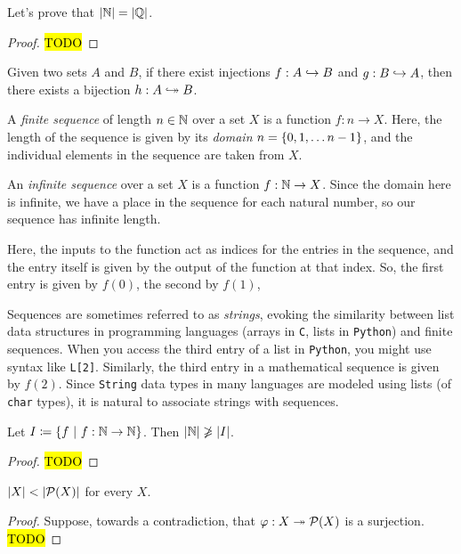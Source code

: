 \begin{example}
    Let's prove that $\cardinality*{\N} = \cardinality*{\Q}$.
\end{example}
\begin{proof}
    \hl{TODO}
\end{proof}

\begin{theorem}
    Given two sets $A$ and $B$,
    if there exist injections $f: A \hookrightarrow B$ and $g: B \hookrightarrow A$,
    then there exists a bijection $h: A \bijection B$.
\end{theorem}

\begin{definition}[Sequences]
    A \emph{finite sequence} of length $n \in \mathbb{N}$ over a set $X$ is a function $f: n \to X$.
    Here, the length of the sequence is given by its \emph{domain} $n = \set*{0, 1, \dots n - 1}$,
    and the individual elements in the sequence are taken from $X$.

    An \emph{infinite sequence} over a set $X$ is a function $f: \mathbb{N} \to X$.
    Since the domain here is infinite, we have a place in the sequence for each natural number,
    so our sequence has infinite length.

    Here, the inputs to the function act as indices for the entries in the sequence,
    and the entry itself is given by the output of the function at that index.
    So, the first entry is given by $f(0)$, the second by $f(1)$, \etc

    Sequences are sometimes referred to as \emph{strings},
    evoking the similarity between list data structures in programming languages
    (\eg arrays in \texttt{C}, lists in \texttt{Python})
    and finite sequences.
    When you access the third entry of a list in \texttt{Python},
    you might use syntax like \texttt{L[2]}.
    Similarly, the third entry in a mathematical sequence is given by $f(2)$.
    Since \texttt{String} data types in many languages are modeled using lists (\eg of \texttt{char} types),
    it is natural to associate strings with sequences.
\end{definition}

\begin{theorem}
    Let $I \defn \set*{f \suchthat f: \N \to \N}$.
    Then $\cardinality*{\N} \not \geq \cardinality*{I}$.
\end{theorem}
\begin{proof}
    \hl{TODO}
\end{proof}

\begin{theorem}
    $\cardinality*{X} < \cardinality*{\power{X}}$ for every $X$.
\end{theorem}
\begin{proof}
    Suppose, towards a contradiction, that $\varphi: X \surj \power{X}$ is a surjection.
    \hl{TODO}
\end{proof}


